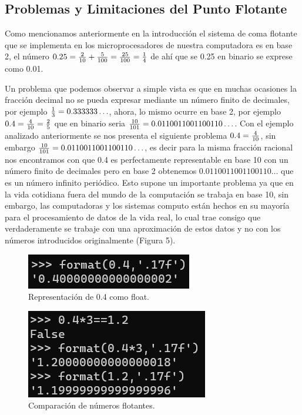 \documentclass[a4paper,10pt,twocolumn]{article}
\begin{document}
\subsection{Problemas y Limitaciones del Punto Flotante}\label{sub:problems_limitations}
	Como mencionamos anteriormente en la introducción el sistema de coma flotante que se implementa en los microprocesadores de nuestra computadora es en base 2, el número $0.25={2\over 10}+{5\over 100}={25\over 100}={1\over 4}$ de ahí que se 0.25 en binario se exprese como 0.01. 
	
	Un problema que podemos observar a simple vista es que en muchas ocasiones la fracción decimal no se pueda expresar mediante un número finito de decimales, por ejemplo ${1\over 3}=0.333333\ldots$, ahora, lo mismo ocurre en base 2, por ejemplo $0.4={4\over 10}={2\over 5}$ que en binario seria ${10\over 101}=0.0110011001100110\ldots$. Con el ejemplo analizado anteriormente se nos presenta el siguiente problema $0.4={4\over 10}$, sin embargo ${10\over 101}=0.0110011001100110\ldots$, es decir para la misma fracción racional nos encontramos con que 0.4 es perfectamente representable en base 10 con un número finito de decimales pero en base 2 obtenemos $0.0110011001100110\ldots$ que es un número infinito periódico. Esto supone un importante problema ya que en la vida cotidiana fuera del mundo de la computación se trabaja en base 10, sin embargo, las computadoras y los sistemas computo están hechos en su mayoría para el procesamiento de datos de la vida real, lo cual trae consigo que verdaderamente se trabaje con una aproximación de estos datos y no con los números introducidos originalmente (Figura 5).
	
	\begin{figure}
		\begin{center}
			\includegraphics[scale=1]{recourses/repre04.png}
			\caption{Representación de 0.4 como float.\label{fig:code}}
		\end{center}
	\end{figure}
	
	\begin{figure}
		\begin{center}
			\includegraphics[scale=1]{recourses/comp04mult3.png}
			\caption{Comparación de números flotantes.\label{fig:code}}
		\end{center}
	\end{figure}
	
\end{document}
